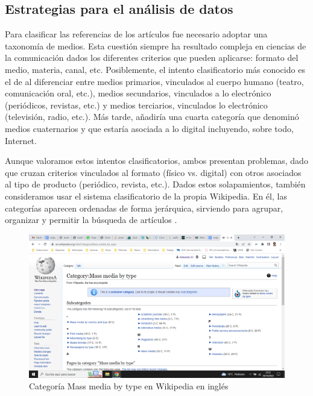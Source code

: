 \documentclass[spanish]{textolivre}
\begin{document}
\subsection{Estrategias para el análisis de datos}
Para clasificar las referencias de los artículos fue necesario adoptar una taxonomía de medios. Esta cuestión siempre ha resultado compleja en ciencias de la comunicación dados los diferentes criterios que pueden aplicarse: formato del medio, materia, canal, etc. Posiblemente, el intento clasificatorio más conocido es el de \textcite{beth1990introduccion} al diferenciar entre medios primarios, vinculados al cuerpo humano (teatro, comunicación oral, etc.), medios secundarios, vinculados a lo electrónico (periódicos, revistas, etc.) y medios terciarios, vinculados lo electrónico (televisión, radio, etc.). Más tarde, \textcite{rehberg_informationelle_1997} añadiría una cuarta categoría que denominó medios cuaternarios y que estaría asociada a lo digital incluyendo, sobre todo, Internet.

Aunque valoramos estos intentos clasificatorios, ambos presentan problemas, dado que cruzan criterios vinculados al formato (físico vs. digital) con otros asociados al tipo de producto (periódico, revista, etc.). Dados estos solapamientos, también consideramos usar el sistema clasificatorio de la propia Wikipedia. En él, las categorías aparecen ordenadas de forma jerárquica, sirviendo para agrupar, organizar y permitir la búsqueda de artículos \cite{gangemi_tagtheweb:_2018}.

\begin{figure}[htbp]
\centering
\begin{minipage}{.85\textwidth}
 \includegraphics[width=\textwidth]{fig02.png}
 \caption{Categoría Mass media by type en Wikipedia en inglés}
 \label{fig02}
\end{minipage}
\end{figure}
\end{document}
